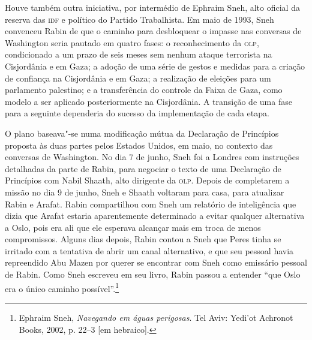 Houve também outra iniciativa, por intermédio de Ephraim Sneh, alto
oficial da reserva das \textsc{idf} e político do Partido Trabalhista. Em maio de
1993, Sneh convenceu Rabin de que o caminho para desbloquear o impasse
nas conversas de Washington seria pautado em quatro fases: o
reconhecimento da \textsc{olp}, condicionado a um prazo de seis meses sem nenhum
ataque terrorista na Cisjordânia e em Gaza; a adoção de uma série de
gestos e medidas para a criação de confiança na Cisjordânia e em Gaza; a
realização de eleições para um parlamento palestino; e a transferência
do controle da Faixa de Gaza, como modelo a ser aplicado posteriormente
na Cisjordânia. A transição de uma fase para a seguinte dependeria
do sucesso da implementação de cada etapa.

O plano baseava"-se numa modificação mútua da Declaração de Princípios
proposta às duas partes pelos Estados Unidos, em maio, no contexto das
conversas de Washington. No dia 7 de junho, Sneh foi a Londres com
instruções detalhadas da parte de Rabin, para negociar o texto de uma
Declaração de Princípios com Nabil Shaath, alto dirigente da \textsc{olp}. Depois
de completarem a missão no dia 9 de junho, Sneh e Shaath voltaram para
casa, para atualizar Rabin e Arafat. Rabin compartilhou com Sneh um
relatório de inteligência que dizia que Arafat estaria aparentemente
determinado a evitar qualquer alternativa a Oslo, pois era ali que ele
esperava alcançar mais em troca de menos compromissos. Alguns dias
depois, Rabin contou a Sneh que Peres tinha se irritado com a
tentativa de abrir um canal alternativo, e que seu pessoal havia
repreendido Abu Mazen por querer se encontrar com Sneh como emissário
pessoal de Rabin. Como Sneh escreveu em seu livro, Rabin passou a
entender ``que Oslo era o único caminho possível''.\footnote{Ephraim
  Sneh, \emph{Navegando em águas perigosas}. Tel Aviv: Yedi'ot Achronot Books, 2002, p. 22--3
  {[}em hebraico{]}.}

